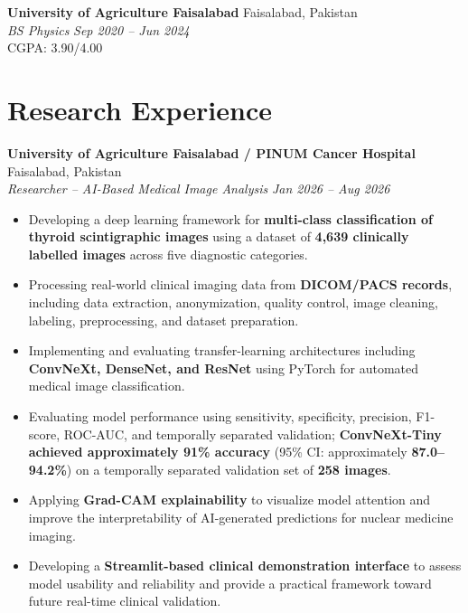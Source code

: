 \documentclass[10.5pt,a4paper]{article}
\begin{document}
\vspace{4pt}

\textbf{University of Agriculture Faisalabad}
\hfill Faisalabad, Pakistan\\
\textit{BS Physics}
\hfill \textit{Sep 2020 -- Jun 2024}\\
CGPA: 3.90/4.00



\section{Research Experience}

\textbf{University of Agriculture Faisalabad / PINUM Cancer Hospital}
\hfill Faisalabad, Pakistan\\
\textit{Researcher -- AI-Based Medical Image Analysis}
\hfill \textit{Jan 2026 -- Aug 2026}

\begin{itemize}

    \item Developing a deep learning framework for
    \textbf{multi-class classification of thyroid scintigraphic images}
    using a dataset of \textbf{4,639 clinically labelled images} across
    five diagnostic categories.

    \item Processing real-world clinical imaging data from
    \textbf{DICOM/PACS records}, including data extraction, anonymization,
    quality control, image cleaning, labeling, preprocessing, and dataset
    preparation.

    \item Implementing and evaluating transfer-learning architectures
    including \textbf{ConvNeXt, DenseNet, and ResNet} using PyTorch for
    automated medical image classification.

    \item Evaluating model performance using sensitivity, specificity,
    precision, F1-score, ROC-AUC, and temporally separated validation;
    \textbf{ConvNeXt-Tiny achieved approximately 91\% accuracy}
    (95\% CI: approximately \textbf{87.0--94.2\%}) on a temporally
    separated validation set of \textbf{258 images}.

    \item Applying \textbf{Grad-CAM explainability} to visualize model
    attention and improve the interpretability of AI-generated predictions
    for nuclear medicine imaging.

    \item Developing a \textbf{Streamlit-based clinical demonstration
    interface} to assess model usability and reliability and provide a
    practical framework toward future real-time clinical validation.

\end{itemize}
\end{document}
